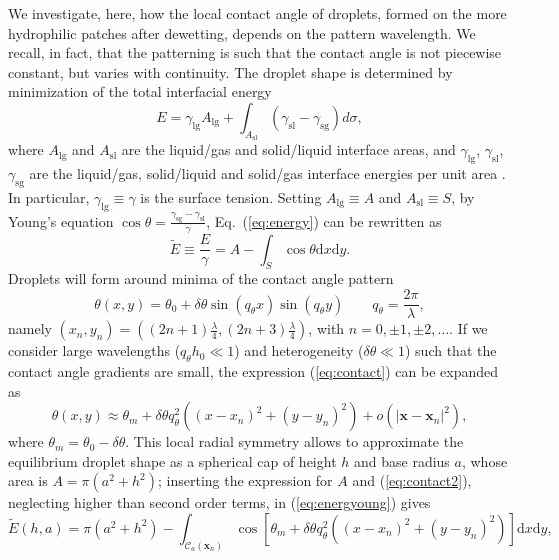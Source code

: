 \documentclass[amsmath,amssymb,showpacs,prl,superscriptaddress,notitlepage]{revtex4-1}
\begin{document}
\noindent We investigate, here, how the local contact angle of droplets, formed on the more
hydrophilic patches after dewetting, depends on the pattern wavelength. We recall, in fact,
that the patterning is such that the contact angle is not piecewise constant, but varies
with continuity.
The droplet shape is determined by minimization of the total interfacial energy
\begin{equation}\label{eq:energy}
E = \gamma_{\text{lg}} A_{\text{lg}} + \int_{A_{\text{sl}}} (\gamma_{\text{sl}} - \gamma_{\text{sg}})d \sigma,
\end{equation}
where $A_{\text{lg}}$ and $A_{\text{sl}}$ are the liquid/gas and solid/liquid interface areas, and $\gamma_{\text{lg}}$, $\gamma_{\text{sl}}$,
$\gamma_{\text{sg}}$ are the liquid/gas, solid/liquid and solid/gas interface energies 
per unit area \cite{WuSM2020}. 
In particular, $\gamma_{\text{lg}} \equiv \gamma$ is the surface tension.
Setting $A_{\text{lg}} \equiv A$ and $A_{\text{sl}} \equiv S$, by Young's equation 
$\cos \theta = \frac{\gamma_{\text{sg}} - \gamma_{\text{sl}}}{\gamma}$,
Eq.~(\ref{eq:energy}) can be rewritten as
\begin{equation}\label{eq:energyoung}
\tilde{E} \equiv \frac{E}{\gamma} = A - \int_S \cos \theta \text{d}x \text{d}y.
\end{equation}
Droplets will form around minima of the contact angle pattern
\begin{equation}\label{eq:contact}
\theta(x,y) = \theta_0 + \delta \theta \sin(q_{\theta} x) \sin (q_{\theta} y) \qquad q_{\theta} = \frac{2\pi}{\lambda},
\end{equation}
namely $(x_n,y_n) = \left((2n+1)\frac{\lambda}{4},(2n+3)\frac{\lambda}{4}\right)$, with
$n=0,\pm 1, \pm 2,\dots$.
If we consider large wavelengths ($q_{\theta} h_0 \ll 1$) and heterogeneity
($\delta \theta \ll 1$) such that the contact angle gradients are small, the
expression (\ref{eq:contact}) can be expanded as
\begin{equation}\label{eq:contact2}
\theta(x,y) \approx \theta_m + \delta \theta q_{\theta}^2 ((x-x_n)^2 + (y - y_n)^2) + o(|\mathbf{x}-\mathbf{x}_n|^2),
\end{equation}
where $\theta_m = \theta_0 - \delta \theta$.
This local radial symmetry allows to approximate the equilibrium droplet shape as a spherical cap of
height $h$ and base radius $a$, whose area is $A = \pi(a^2 + h^2)$; inserting the expression for
$A$ and (\ref{eq:contact2}), neglecting higher than second order terms, in (\ref{eq:energyoung}) gives
\begin{equation}\label{eq:energy3}
  \tilde{E}(h,a) = \pi(a^2 + h^2) -
  \int_{\mathcal{C}_a(\mathbf{x}_n)} \cos\left[\theta_m + \delta \theta q_{\theta}^2 ((x-x_n)^2 + (y - y_n)^2)\right]
    \text{d}x\text{d}y,
\end{equation}  
\end{document}
